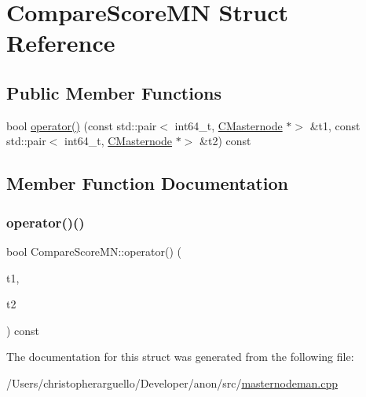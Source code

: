\hypertarget{struct_compare_score_m_n}{}\section{Compare\+Score\+MN Struct Reference}
\label{struct_compare_score_m_n}
\subsection*{Public Member Functions}
\begin{DoxyCompactItemize}
\item 
bool \mbox{\hyperlink{struct_compare_score_m_n_aaf59a57f61e5deae2d15361dae62cd4a}{operator()}} (const std\+::pair$<$ int64\+\_\+t, \mbox{\hyperlink{class_c_masternode}{C\+Masternode}} $\ast$$>$ \&t1, const std\+::pair$<$ int64\+\_\+t, \mbox{\hyperlink{class_c_masternode}{C\+Masternode}} $\ast$$>$ \&t2) const
\end{DoxyCompactItemize}


\subsection{Member Function Documentation}
\mbox{\label{struct_compare_score_m_n_aaf59a57f61e5deae2d15361dae62cd4a}} 
\subsubsection{\texorpdfstring{operator()()}{operator()()}}
{\footnotesize\ttfamily bool Compare\+Score\+M\+N\+::operator() (\begin{DoxyParamCaption}\item[{const std\+::pair$<$ int64\+\_\+t, \mbox{\hyperlink{class_c_masternode}{C\+Masternode}} $\ast$$>$ \&}]{t1,  }\item[{const std\+::pair$<$ int64\+\_\+t, \mbox{\hyperlink{class_c_masternode}{C\+Masternode}} $\ast$$>$ \&}]{t2 }\end{DoxyParamCaption}) const\hspace{0.3cm}{\ttfamily [inline]}}



The documentation for this struct was generated from the following file\+:\begin{DoxyCompactItemize}
\item 
/\+Users/christopherarguello/\+Developer/anon/src/\mbox{\hyperlink{masternodeman_8cpp}{masternodeman.\+cpp}}\end{DoxyCompactItemize}
